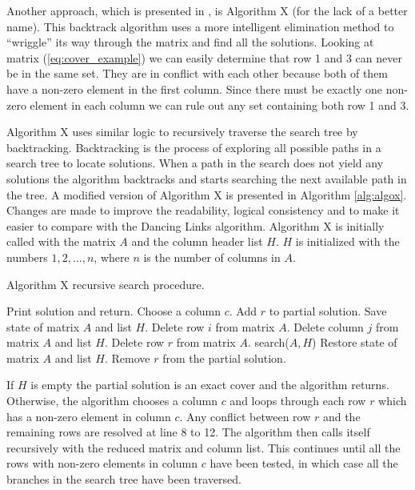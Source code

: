 Another approach, which is presented in \cite{knuth00dancing}, is Algorithm X (for the lack of a better name).
This backtrack algorithm uses a more intelligent elimination method to ``wriggle'' its way through the matrix and find all the solutions.
Looking at matrix (\ref{eq:cover_example}) we can easily determine that row 1 and 3 can never be in the same set.
They are in conflict with each other because both of them have a non-zero element in the first column.
Since there must be exactly one non-zero element in each column we can rule out any set containing both row 1 and 3.

Algorithm X uses similar logic to recursively traverse the search tree by backtracking.
Backtracking is the process of exploring all possible paths in a search tree to locate solutions.
When a path in the search does not yield any solutions the algorithm backtracks and starts searching the next available path in the tree.
A modified version of Algorithm X is presented in Algorithm \ref{alg:algox}.
Changes are made to improve the readability, logical consistency and to make it easier to compare with the Dancing Links algorithm.
Algorithm X is initially called with the matrix $A$ and the column header list $H$.
$H$ is initialized with the numbers $1, 2, \ldots, n$, where $n$ is the number of columns in $A$.

\begin{algorithm}[htbp]
	\caption{Algorithm X recursive search procedure.}
	\label{alg:algox}
	\begin{distribalgo}[1]
				\STATE Print solution and return.  
			\ENDIF
			\STATE Choose a column $c$.
				\STATE Add $r$ to partial solution.
				\STATE Save state of matrix $A$ and list $H$.
						\STATE Delete row $i$ from matrix $A$.
					\ENDFOR
					\STATE Delete column $j$ from matrix $A$ and list $H$.
				\ENDFOR
				\STATE Delete row $r$ from matrix $A$.
				\STATE search($A,H$)
				\STATE Restore state of matrix $A$ and list $H$.
				\STATE Remove $r$ from the partial solution.
			\ENDFOR
		\ENDPROC
	\end{distribalgo}
\end{algorithm}

If $H$ is empty the partial solution is an exact cover and the algorithm returns.
Otherwise, the algorithm chooses a column $c$ and loops through each row $r$ which has a non-zero element in column $c$.
Any conflict between row $r$ and the remaining rows are resolved at line 8 to 12.
The algorithm then calls itself recursively with the reduced matrix and column list.
This continues until all the rows with non-zero elements in column $c$ have been tested, in which case all the branches in the search tree have been traversed.


